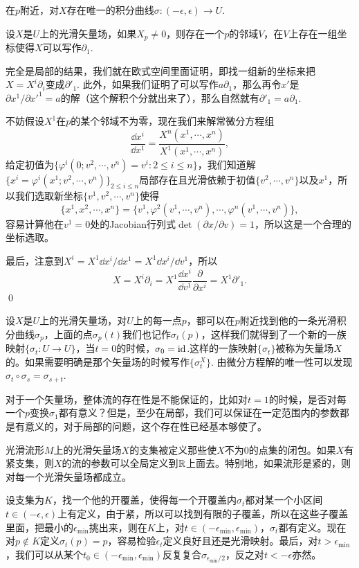 \para 在$p$附近，对$X$存在唯一的积分曲线$\sigma:(-\epsilon,\epsilon)\to U$.

\lem 设$X$是$U$上的光滑矢量场，如果$X_p\neq 0$，则存在一个$p$的邻域$V$，在$V$上存在一组坐标使得$X$可以写作$\partial_1$.

\proof
	完全是局部的结果，我们就在欧式空间里面证明，即找一组新的坐标来把$X=X^i\partial_i$变成$\partial'_1$. 此外，如果我们证明了可以写作$a \partial_1$，那么再令$x'$是$\partial x^1/\partial x'^1=a$的解（这个解积个分就出来了），那么自然就有$\partial'_1=a\partial_1$.

	不妨假设$X^1$在$p$的某个邻域不为零，现在我们来解常微分方程组
	\[
		\frac{\dd x^i}{\dd x^1}=\frac{X^n(x^1,\cdots,x^n)}{X^1(x^1,\cdots,x^n)},
	\]
	给定初值为$\{\varphi^i(0;v^2,\cdots,v^n)=v^i:2\leq i \leq n\}$，我们知道解$\{x^i=\varphi^i(x^1;v^2,\cdots,v^n)\}_{2\leq i \leq n}$局部存在且光滑依赖于初值$\{v^2,\cdots,v^n\}$以及$x^1$，所以我们选取新坐标$\{v^1,v^2,\cdots,v^n\}$使得
	\[
		\{x^1,x^2,\cdots,x^n\}=\{v^1,\varphi^2(v^1,\cdots,v^n),\cdots,\varphi^n(v^1,\cdots,v^n)\},
	\]
	容易计算他在$v^1=0$处的Jacobian行列式$\det(\partial x/\partial v)=1$，所以这是一个合理的坐标选取。

	最后，注意到$X^i=X^1 \dd x^i/\dd x^1=X^1 \dd x^i/\dd v^1$，所以
	\[
		X=X^i\partial_i=X^1 \frac{\dd x^i}{\dd v^1}\frac{\partial}{\partial x^i}=X^1\partial'_1.
	\]\qed

设$X$是$U$上的光滑矢量场，对$U$上的每一点$p$，都可以在$p$附近找到他的一条光滑积分曲线$\sigma_p$，上面的点$\sigma_p(t)$我们也记作$\sigma_t(p)$，这样我们就得到了一个新的一族映射$\{\sigma_t:U\to U\}$，当$t=0$的时候，$\sigma_0=\operatorname{id}$.这样的一族映射$\{\sigma_t\}$被称为矢量场$X$的。如果需要明确是那个矢量场的时候写作$\{\sigma^X_t\}$. 由微分方程解的唯一性可以发现$\sigma_t\circ \sigma_s=\sigma_{s+t}$.

对于一个矢量场，整体流的存在性是不能保证的，比如对$t=1$的时候，是否对每一个$p$变换$\sigma_1$都有意义？但是，至少在局部，我们可以保证在一定范围内的参数都是有意义的，对于局部的问题，这个存在性已经基本够使了。

\para 光滑流形$M$上的光滑矢量场$X$的支集被定义那些使$X$不为$0$的点集的闭包。如果$X$有紧支集，则$X$的流的参数可以全局定义到$\mathbb{R}$上面去。特别地，如果流形是紧的，则对每一个光滑矢量场都成立。

设支集为$K$，找一个他的开覆盖，使得每一个开覆盖内$\sigma_t$都对某一个小区间$t\in (-\epsilon,\epsilon)$上有定义，由于紧，所以可以找到有限的子覆盖，所以在这些子覆盖里面，把最小的$\epsilon_{\text{min}}$挑出来，则在$K$上，对$t\in(-\epsilon_{\text{min}},\epsilon_{\text{min}})$，$\sigma_t$都有定义。现在对$p\notin K$定义$\sigma_t(p)=p$，容易检验$\epsilon_t$定义良好且还是光滑映射。最后，对$t>\epsilon_{\text{min}}$，我们可以从某个$t_0\in (-\epsilon_{\text{min}},\epsilon_{\text{min}})$反复复合$\sigma_{\epsilon_{\text{min}}/2}$，反之对$t<-\epsilon$亦然。

